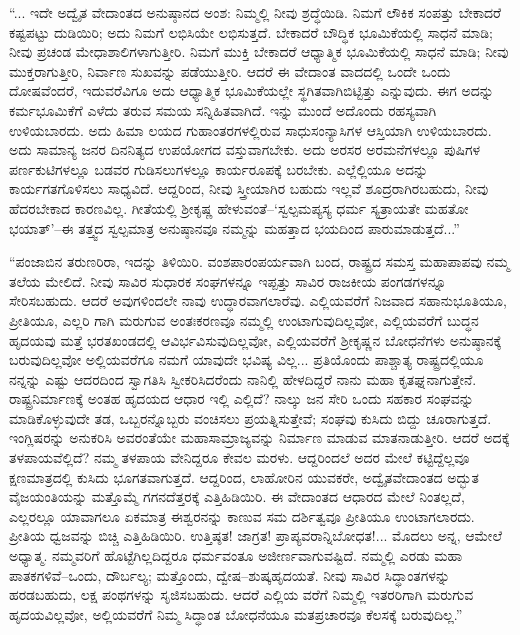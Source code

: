“... ಇದೇ ಅದ್ವೈತ ವೇದಾಂತದ ಅನುಷ್ಠಾನದ ಅಂಶ: ನಿಮ್ಮಲ್ಲಿ ನೀವು ಶ್ರದ್ಧೆಯಿಡಿ. ನಿಮಗೆ ಲೌಕಿಕ ಸಂಪತ್ತು ಬೇಕಾದರೆ ಕಷ್ಟಪಟ್ಟು ದುಡಿಯಿರಿ; ಅದು ನಿಮಗೆ ಲಭಿಸಿಯೇ ಲಭಿಸುತ್ತದೆ. ಬೇಕಾದರೆ ಬೌದ್ಧಿಕ ಭೂಮಿಕೆಯಲ್ಲಿ ಸಾಧನೆ ಮಾಡಿ; ನೀವು ಪ್ರಚಂಡ ಮೇಧಾಶಾಲಿಗಳಾಗುತ್ತೀರಿ. ನಿಮಗೆ ಮುಕ್ತಿ ಬೇಕಾದರೆ ಆಧ್ಯಾತ್ಮಿಕ ಭೂಮಿಕೆಯಲ್ಲಿ ಸಾಧನೆ ಮಾಡಿ; ನೀವು ಮುಕ್ತರಾಗುತ್ತೀರಿ, ನಿರ್ವಾಣ ಸುಖವನ್ನು ಪಡೆಯುತ್ತೀರಿ. ಆದರೆ ಈ ವೇದಾಂತ ವಾದದಲ್ಲಿ ಒಂದೇ ಒಂದು ದೋಷವೆಂದರೆ, ಇದುವರೆವಿಗೂ ಅದು ಆಧ್ಯಾತ್ಮಿಕ ಭೂಮಿಕೆಯಲ್ಲೇ ಸ್ಥಗಿತವಾಗಿಬಿಟ್ಟಿತ್ತು ಎನ್ನುವುದು. ಈಗ ಅದನ್ನು ಕರ್ಮಭೂಮಿಕೆಗೆ ಎಳೆದು ತರುವ ಸಮಯ ಸನ್ನಿಹಿತವಾಗಿದೆ. ಇನ್ನು ಮುಂದೆ ಅದೊಂದು ರಹಸ್ಯವಾಗಿ ಉಳಿಯಬಾರದು. ಅದು ಹಿಮಾ ಲಯದ ಗುಹಾಂತರಗಳಲ್ಲಿರುವ ಸಾಧುಸಂನ್ಯಾಸಿಗಳ ಆಸ್ತಿಯಾಗಿ ಉಳಿಯಬಾರದು. ಅದು ಸಾಮಾನ್ಯ ಜನರ ದಿನನಿತ್ಯದ ಉಪಯೋಗದ ವಸ್ತುವಾಗಬೇಕು. ಅದು ಅರಸರ ಅರಮನೆಗಳಲ್ಲೂ ಪುಷಿಗಳ ಪರ್ಣಕುಟಿಗಳಲ್ಲೂ ಬಡವರ ಗುಡಿಸಲುಗಳಲ್ಲೂ ಕಾರ್ಯರೂಪಕ್ಕೆ ಬರಬೇಕು. ಎಲ್ಲೆಲ್ಲಿಯೂ ಅದನ್ನು ಕಾರ್ಯಗತಗೊಳಿಸಲು ಸಾಧ್ಯವಿದೆ. ಆದ್ದರಿಂದ, ನೀವು ಸ್ತ್ರೀಯಾಗಿರ ಬಹುದು ಇಲ್ಲವೆ ಶೂದ್ರರಾಗಿರಬಹುದು, ನೀವು ಹೆದರಬೇಕಾದ ಕಾರಣವಿಲ್ಲ. ಗೀತೆಯಲ್ಲಿ ಶ್ರೀಕೃಷ್ಣ ಹೇಳುವಂತೆ–‘ಸ್ವಲ್ಪಮಪ್ಯಸ್ಯ ಧರ್ಮ ಸ್ಯತ್ರಾಯತೇ ಮಹತೋ ಭಯಾತ್​’–ಈ ತತ್ತ್ವದ ಸ್ವಲ್ಪಮಾತ್ರ ಅನುಷ್ಠಾನವೂ ನಮ್ಮನ್ನು ಮಹತ್ತಾದ ಭಯದಿಂದ ಪಾರುಮಾಡುತ್ತದೆ...”

“ಪಂಜಾಬಿನ ತರುಣರಿರಾ, ಇದನ್ನು ತಿಳಿಯಿರಿ. ವಂಶಪಾರಂಪರ್ಯವಾಗಿ ಬಂದ, ರಾಷ್ಟ್ರದ ಸಮಸ್ತ ಮಹಾಪಾಪವು ನಮ್ಮ ತಲೆಯ ಮೇಲಿದೆ. ನೀವು ಸಾವಿರ ಸುಧಾರಕ ಸಂಘಗಳನ್ನೂ ಇಪ್ಪತ್ತು ಸಾವಿರ ರಾಜಕೀಯ ಪಂಗಡಗಳನ್ನೂ ಸೇರಿಸಬಹುದು. ಆದರೆ ಅವುಗಳಿಂದಲೇ ನಾವು ಉದ್ಧಾರವಾಗಲಾರೆವು. ಎಲ್ಲಿಯವರೆಗೆ ನಿಜವಾದ ಸಹಾನುಭೂತಿಯೂ, ಪ್ರೀತಿಯೂ, ಎಲ್ಲರಿ ಗಾಗಿ ಮರುಗುವ ಅಂತಃಕರಣವೂ ನಮ್ಮಲ್ಲಿ ಉಂಟಾಗುವುದಿಲ್ಲವೋ, ಎಲ್ಲಿಯವರೆಗೆ ಬುದ್ಧನ ಹೃದಯವು ಮತ್ತೆ ಭರತಖಂಡದಲ್ಲಿ ಆವಿರ್ಭವಿಸುವುದಿಲ್ಲವೋ, ಎಲ್ಲಿಯವರೆಗೆ ಶ್ರೀಕೃಷ್ಣನ ಬೋಧನೆಗಳು ಅನುಷ್ಠಾನಕ್ಕೆ ಬರುವುದಿಲ್ಲವೋ ಅಲ್ಲಿಯವರೆಗೂ ನಮಗೆ ಯಾವುದೇ ಭವಿಷ್ಯ ವಿಲ್ಲ... ಪ್ರತಿಯೊಂದು ಪಾಶ್ಚಾತ್ಯ ರಾಷ್ಟ್ರದಲ್ಲಿಯೂ ನನ್ನನ್ನು ಎಷ್ಟು ಆದರದಿಂದ ಸ್ವಾಗತಿಸಿ ಸ್ವೀಕರಿಸಿದರೆಂದು ನಾನಿಲ್ಲಿ ಹೇಳದಿದ್ದರೆ ನಾನು ಮಹಾ ಕೃತಘ್ನನಾಗುತ್ತೇನೆ. ರಾಷ್ಟ್ರನಿರ್ಮಾಣಕ್ಕೆ ಅಂತಹ ಹೃದಯದ ಆಧಾರ ಇಲ್ಲಿ ಎಲ್ಲಿದೆ? ನಾಲ್ಕು ಜನ ಸೇರಿ ಒಂದು ಸಹಕಾರ ಸಂಘವನ್ನು ಮಾಡಿಕೊಳ್ಳುವುದೇ ತಡ, ಒಬ್ಬರನ್ನೊಬ್ಬರು ವಂಚಿಸಲು ಪ್ರಯತ್ನಿಸುತ್ತೇವೆ; ಸಂಘವು ಕುಸಿದು ಬಿದ್ದು ಚೂರಾಗುತ್ತದೆ. ಇಂಗ್ಲಿಷರನ್ನು ಅನುಕರಿಸಿ ಅವರಂತೆಯೇ ಮಹಾಸಾಮ್ರಾಜ್ಯವನ್ನು ನಿರ್ಮಾಣ ಮಾಡುವ ಮಾತನಾಡುತ್ತೀರಿ. ಆದರೆ ಅದಕ್ಕೆ ತಳಪಾಯವೆಲ್ಲಿದೆ? ನಮ್ಮ ತಳಪಾಯ ವೇನಿದ್ದರೂ ಕೇವಲ ಮರಳು. ಆದ್ದರಿಂದಲೆ ಅದರ ಮೇಲೆ ಕಟ್ಟಿದ್ದೆಲ್ಲವೂ ಕ್ಷಣಮಾತ್ರದಲ್ಲಿ ಕುಸಿದು ಭೂಗತವಾಗುತ್ತದೆ. ಆದ್ದರಿಂದ, ಲಾಹೋರಿನ ಯುವಕರೇ, ಅದ್ವೈತವೇದಾಂತದ ಅದ್ಭುತ ವೈಜಯಂತಿಯನ್ನು ಮತ್ತೊಮ್ಮೆ ಗಗನದೆತ್ತರಕ್ಕೆ ಎತ್ತಿಹಿಡಿಯಿರಿ. ಈ ವೇದಾಂತದ ಆಧಾರದ ಮೇಲೆ ನಿಂತಲ್ಲದೆ, ಎಲ್ಲರಲ್ಲೂ ಯಾವಾಗಲೂ ಏಕಮಾತ್ರ ಈಶ್ವರನನ್ನು ಕಾಣುವ ಸಮ ದರ್ಶಿತ್ವವೂ ಪ್ರೀತಿಯೂ ಉಂಟಾಗಲಾರದು. ಪ್ರೀತಿಯ ಧ್ವಜವನ್ನು ಬಿಚ್ಚಿ ಎತ್ತಿಹಿಡಿಯಿರಿ. ಉತ್ತಿಷ್ಠತ! ಜಾಗ್ರತ! ಪ್ರಾಪ್ಯವರಾನ್ನಿಬೋಧತ!... ಮೊದಲು ಅನ್ನ, ಆಮೇಲೆ ಅಧ್ಯಾತ್ಮ. ನಮ್ಮವರಿಗೆ ಹೊಟ್ಟೆಗಿಲ್ಲದಿದ್ದರೂ ಧರ್ಮವಂತೂ ಅಜೀರ್ಣವಾಗುವಷ್ಟಿದೆ. ನಮ್ಮಲ್ಲಿ ಎರಡು ಮಹಾ ಪಾತಕಗಳಿವೆ–ಒಂದು, ದೌರ್ಬಲ್ಯ; ಮತ್ತೊಂದು, ದ್ವೇಷ–ಶುಷ್ಕಹೃದಯತೆ. ನೀವು ಸಾವಿರ ಸಿದ್ಧಾಂತಗಳನ್ನು ಹರಡಬಹುದು, ಲಕ್ಷ ಪಂಥಗಳನ್ನು ಸೃಜಿಸಬಹುದು. ಆದರೆ ಎಲ್ಲಿಯ ವರೆಗೆ ನಿಮ್ಮಲ್ಲಿ ಇತರರಿಗಾಗಿ ಮರುಗುವ ಹೃದಯವಿಲ್ಲವೋ, ಅಲ್ಲಿಯವರೆಗೆ ನಿಮ್ಮ ಸಿದ್ಧಾಂತ ಬೋಧನೆಯೂ ಮತಪ್ರಚಾರವೂ ಕೆಲಸಕ್ಕೆ ಬರುವುದಿಲ್ಲ.”

